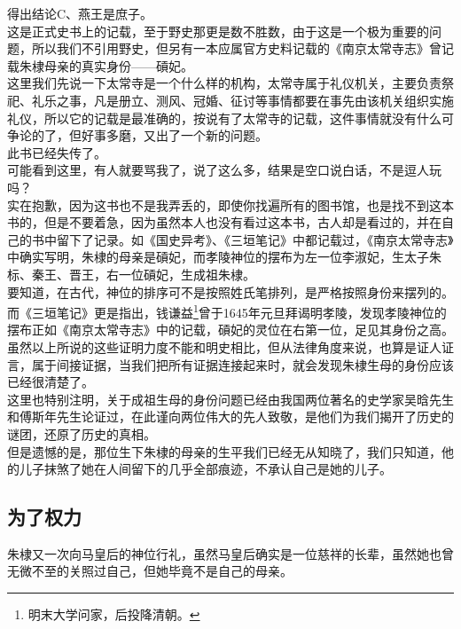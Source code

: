 \begin{multicols}{\theparacolNo}
得出结论C、燕王是庶子。\\

这是正式史书上的记载，至于野史那更是数不胜数，由于这是一个极为重要的问题，所以我们不引用野史，但另有一本应属官方史料记载的《南京太常寺志》曾记载朱棣母亲的真实身份——碽妃。\\

这里我们先说一下太常寺是一个什么样的机构，太常寺属于礼仪机关，主要负责祭祀、礼乐之事，凡是册立、测风、冠婚、征讨等事情都要在事先由该机关组织实施礼仪，所以它的记载是最准确的，按说有了太常寺的记载，这件事情就没有什么可争论的了，但好事多磨，又出了一个新的问题。\\

此书已经失传了。\\

可能看到这里，有人就要骂我了，说了这么多，结果是空口说白话，不是逗人玩吗？\\

实在抱歉，因为这书也不是我弄丢的，即使你找遍所有的图书馆，也是找不到这本书的，但是不要着急，因为虽然本人也没有看过这本书，古人却是看过的，并在自己的书中留下了记录。如《国史异考》、《三垣笔记》中都记载过，《南京太常寺志》中确实写明，朱棣的母亲是碽妃，而孝陵神位的摆布为左一位李淑妃，生太子朱标、秦王、晋王，右一位碽妃，生成祖朱棣。\\

要知道，在古代，神位的排序可不是按照姓氏笔排列，是严格按照身份来摆列的。\\

而《三垣笔记》更是指出，钱谦益\footnote{明末大学问家，后投降清朝。}曾于1645年元旦拜谒明孝陵，发现孝陵神位的摆布正如《南京太常寺志》中的记载，碽妃的灵位在右第一位，足见其身份之高。\\

虽然以上所说的这些证明力度不能和明史相比，但从法律角度来说，也算是证人证言，属于间接证据，当我们把所有证据连接起来时，就会发现朱棣生母的身份应该已经很清楚了。\\

这里也特别注明，关于成祖生母的身份问题已经由我国两位著名的史学家吴晗先生和傅斯年先生论证过，在此谨向两位伟大的先人致敬，是他们为我们揭开了历史的谜团，还原了历史的真相。\\

但是遗憾的是，那位生下朱棣的母亲的生平我们已经无从知晓了，我们只知道，他的儿子抹煞了她在人间留下的几乎全部痕迹，不承认自己是她的儿子。\\

\subsection{为了权力}
朱棣又一次向马皇后的神位行礼，虽然马皇后确实是一位慈祥的长辈，虽然她也曾无微不至的关照过自己，但她毕竟不是自己的母亲。\\


\end{multicols}
